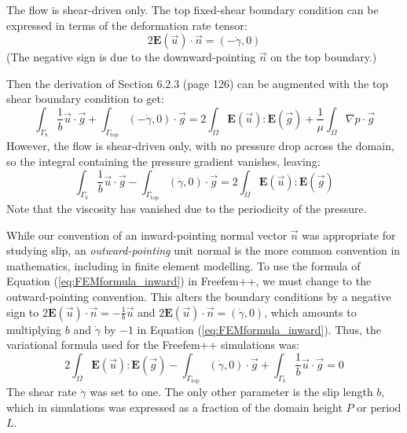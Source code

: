 \documentclass[12pt, a4paper, twoside, openright]{book}
\begin{document}
The flow is shear-driven only.  The top fixed-shear boundary condition can be expressed in terms of the deformation rate tensor:
\begin{equation}
 2 \mathbf{E}(\vec{u}) \cdot \vec{n} = (- \dot{\gamma}, 0)
\end{equation}
(The negative sign is due to the downward-pointing $\vec{n}$ on the top boundary.)

Then the derivation of Section 6.2.3 (page 126) can be augmented with the top shear boundary condition to get:
\begin{equation}
\int_{\Gamma_b} \frac{1}{b} \vec{u} \cdot \vec{g} +
\int_{\Gamma_{\mathrm{top}}} (-\dot{\gamma},0) \cdot \vec{g} = 
2 \int_{\Omega} \mathbf{E}(\vec{u}) : \mathbf{E}(\vec{g}) +
\frac{1}{\mu} \int_{\Omega}  \nabla p \cdot \vec{g}
\end{equation}
However, the flow is shear-driven only, with no pressure drop across the domain, so the integral containing the pressure gradient vanishes, leaving:
\begin{equation}
\int_{\Gamma_b} \frac{1}{b} \vec{u} \cdot \vec{g} -
\int_{\Gamma_{\mathrm{top}}} (\dot{\gamma},0) \cdot \vec{g} = 
2 \int_{\Omega} \mathbf{E}(\vec{u}) : \mathbf{E}(\vec{g})
\label{eq:FEMformula_inward}
\end{equation}
Note that the viscosity has vanished due to the periodicity of the pressure.

While our convention of an inward-pointing normal vector $\vec{n}$ was appropriate for studying slip, an \emph{outward-pointing} unit normal is the more common convention in mathematics, including in finite element modelling.  To use the formula of Equation (\ref{eq:FEMformula_inward}) in Freefem++, we must change to the outward-pointing convention. This alters the boundary conditions by a negative sign to $ 2 \mathbf{E}(\vec{u}) \cdot \vec{n} = -\frac{1}{b} \vec{u} $ and $2 \mathbf{E}(\vec{u}) \cdot \vec{n} = (\dot{\gamma}, 0) $, which amounts to multiplying $b$ and $\dot{\gamma}$ by $-1$ in Equation (\ref{eq:FEMformula_inward}).  Thus, the variational formula used for the Freefem++ simulations was:
\begin{equation}
2 \int_{\Omega} \mathbf{E}(\vec{u}) : \mathbf{E}(\vec{g}) -
\int_{\Gamma_{\mathrm{top}}} (\dot{\gamma},0) \cdot \vec{g} +
\int_{\Gamma_b} \frac{1}{b} \vec{u} \cdot \vec{g} = 0
\end{equation}
The shear rate $\dot{\gamma}$ was set to one.  The only other parameter is the slip length $b$, which in simulations was expressed as a fraction of the domain height $P$ or period $L$.
\end{document}
